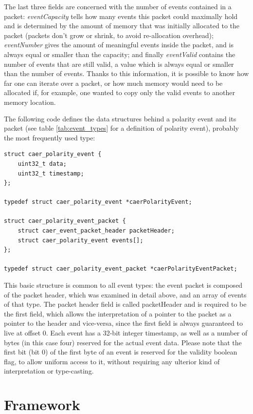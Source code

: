 \documentclass[a4paper,12pt]{report}
\begin{document}
The last three fields are concerned with the number of events contained in a packet: \emph{eventCapacity} tells how many events this packet could maximally hold and is determined by the amount of memory that was initially allocated to the packet (packets don't grow or shrink, to avoid re-allocation overhead); \emph{eventNumber} gives the amount of meaningful events inside the packet, and is always equal or smaller than the capacity; and finally \emph{eventValid} contains the number of events that are still valid, a value which is always equal or smaller than the number of events. Thanks to this information, it is possible to know how far one can iterate over a packet, or how much memory would need to be allocated if, for example, one wanted to copy only the valid events to another memory location.

The following code defines the data structures behind a polarity event and its packet (see table \ref{tab:event_types} for a definition of polarity event), probably the most frequently used type:

\begin{lstlisting}
struct caer_polarity_event {
    uint32_t data;
    uint32_t timestamp;
};

typedef struct caer_polarity_event *caerPolarityEvent;

struct caer_polarity_event_packet {
    struct caer_event_packet_header packetHeader;
    struct caer_polarity_event events[];
};

typedef struct caer_polarity_event_packet *caerPolarityEventPacket;
\end{lstlisting}

This basic structure is common to all event types: the event packet is composed of the packet header, which was examined in detail above, and an array of events of that type. The packet header field is called packetHeader and is required to be the first field, which allows the interpretation of a pointer to the packet as a pointer to the header and vice-versa, since the first field is always guaranteed to live at offset 0.
Each event has a 32-bit integer timestamp, as well as a number of bytes (in this case four) reserved for the actual event data.
Please note that the first bit (bit 0) of the first byte of an event is reserved for the validity boolean flag, to allow uniform access to it, without requiring any ulterior kind of interpretation or type-casting.

\section{Framework} \label{sec:framework}
\end{document}
